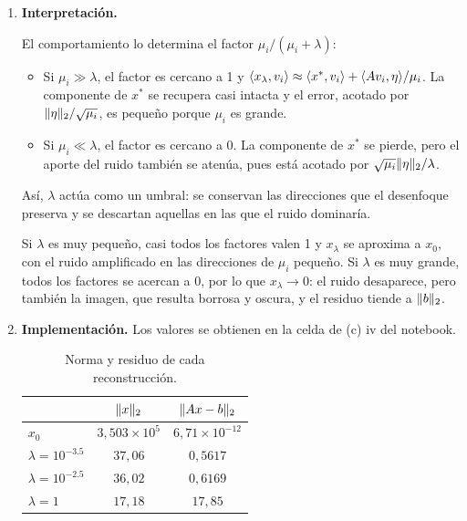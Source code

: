 \documentclass{article}
\begin{document}
\begin{enumerate}[label=\roman*., widest=iv]
  Los números $\ip{x_\lambda}{v_i}$ son las coordenadas de $x_\lambda$ en la base $v_1, \dots, v_n$. El primer término depende solo de la imagen verdadera: es la coordenada $\ip{x^*}{v_i}$ multiplicada por el factor $\mu_i/(\mu_i + \lambda) \in [0, 1)$, y es lo único que quedaría si no hubiera ruido. El segundo depende solo de $\eta$ y no de $x^*$, por lo que es el aporte del ruido. A diferencia de (b), donde el error en la dirección $v_i$ solo se podía acotar por $\norm{\eta}_2/\sqrt{\mu_i}$, que explota cuando $\mu_i \to 0$, ahora la cota no depende de $\mu_i$.

  \item \textbf{Interpretación.}

  El comportamiento lo determina el factor $\mu_i/(\mu_i + \lambda)$:
  \begin{itemize}
    \item Si $\mu_i \gg \lambda$, el factor es cercano a 1 y $\langle x_\lambda, v_i\rangle \approx \langle x^*, v_i\rangle + \langle Av_i, \eta\rangle/\mu_i$. La componente de $x^*$ se recupera casi intacta y el error, acotado por $\norm{\eta}_2/\sqrt{\mu_i}$, es pequeño porque $\mu_i$ es grande.
    \item Si $\mu_i \ll \lambda$, el factor es cercano a 0. La componente de $x^*$ se pierde, pero el aporte del ruido también se atenúa, pues está acotado por $\sqrt{\mu_i}\lVert\eta\rVert_2/\lambda$.
  \end{itemize}
  Así, $\lambda$ actúa como un umbral: se conservan las direcciones que el desenfoque preserva y se descartan aquellas en las que el ruido dominaría.

  Si $\lambda$ es muy pequeño, casi todos los factores valen 1 y $x_\lambda$ se aproxima a $x_0$, con el ruido amplificado en las direcciones de $\mu_i$ pequeño. Si $\lambda$ es muy grande, todos los factores se acercan a 0, por lo que $x_\lambda \to 0$: el ruido desaparece, pero también la imagen, que resulta borrosa y oscura, y el residuo tiende a $\lVert b\rVert_2$.

  \item \textbf{Implementación.} Los valores se obtienen en la celda de (c) iv del notebook.

  \begin{table}[H]
    \centering
    \begin{tabular}{>{\filatabla}l c c}
      \toprule[0.8bp]
                           & $\lVert x\rVert_2$ & $\lVert Ax - b\rVert_2$ \\
      \midrule[0.4bp]
      $x_0$                & $3{,}503 \times 10^{5}$ & $6{,}71 \times 10^{-12}$ \\
      $\lambda = 10^{-3.5}$ & $37{,}06$ & $0{,}5617$ \\
      $\lambda = 10^{-2.5}$ & $36{,}02$ & $0{,}6169$ \\
      $\lambda = 1$        & $17{,}18$ & $17{,}85$ \\
      \bottomrule[0.8bp]
    \end{tabular}
    \caption{Norma y residuo de cada reconstrucción.}
    \label{tab:ridge}
  \end{table}


\end{enumerate}
\end{document}
